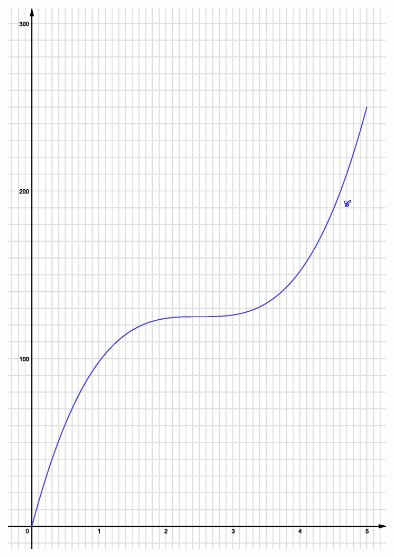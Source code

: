 \begin{center}
     \begin{extern}%
          \includegraphics[width=10cm]{images/BBESL-s1-2-1.eps}%
     \end{extern}
\end{center}
%

